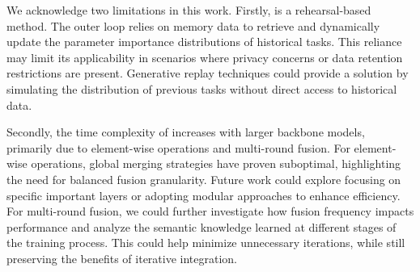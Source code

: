 

We acknowledge two limitations in this work.
Firstly, {\ouralg} is a rehearsal-based method. The outer loop relies on memory data to retrieve and dynamically update the parameter importance distributions of historical tasks.
This reliance may limit its applicability in scenarios where privacy concerns or data retention restrictions are present. Generative replay techniques could provide a solution by simulating the distribution of previous tasks without direct access to historical data.


Secondly, the time complexity of {\ouralg} increases with larger backbone models, primarily due to element-wise operations and multi-round fusion. For element-wise operations, global merging strategies have proven suboptimal, highlighting the need for balanced fusion granularity. Future work could explore focusing on specific important layers or adopting modular approaches to enhance efficiency. 
For multi-round fusion, we could further investigate how fusion frequency impacts performance and analyze the semantic knowledge learned at different stages of the training process. This could help minimize unnecessary iterations, while still preserving the benefits of iterative integration.









